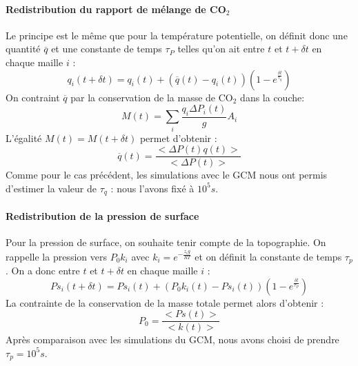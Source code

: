 \documentclass[11pt,a4paper]{article}
\begin{document}
\paragraph{Redistribution du rapport de mélange de CO$_2$ \\} 
Le principe est le même que pour la température potentielle, on définit donc une quantité $\overline{q}$ et une constante de temps $\tau_P$ telles qu'on ait entre $t$ et $t+\delta t$ en chaque maille $i$ :
\begin{equation}
q_i(t+\delta t) = q_i(t) + \left( \overline{q}(t) -  q_i(t) \right) \left( 1 - e^{\frac{\delta t}{\tau_q}} \right)
\end{equation}
On contraint $\overline{q}$ par la conservation de la masse de CO$_2$ dans la couche:
\begin{equation}
M(t) = \sum_i \frac{q_i \Delta P_i(t)}{g} A_i
\end{equation}
L'égalité $M(t) = M(t+\delta t)$ permet d'obtenir :
\begin{equation}
\overline{q}(t) =  \frac{< \Delta P(t)q(t) >}{< \Delta P(t) >}
\end{equation}
 Comme pour le cas précédent, les simulations avec le GCM nous ont permis d'estimer la valeur de $\tau_q$ : nous l'avons fixé à $10^5s$. \\
 
\paragraph{Redistribution de la pression de surface \\} 
Pour la pression de surface, on souhaite tenir compte de la topographie. On rappelle la pression vers $P_0 k_i$ avec $k_i = e^{-\frac{z_i g}{RT}}$ et on définit la constante de temps $\tau_p$. On a donc entre $t$ et $t + \delta t$ en chaque maille $i$ :
\begin{equation}
Ps_i(t+\delta t) = Ps_i(t) + \left( P_0 k_i(t) -  Ps_i(t) \right) \left( 1 - e^{\frac{\delta t}{\tau_P}} \right)
\end{equation}
La contrainte de la conservation de la masse totale permet alors d'obtenir :
\begin{equation}
P_0 = \frac{< Ps(t) >}{< k(t) >}
\end{equation}
Après comparaison avec les simulations du GCM, nous avons choisi de prendre $\tau_p = 10^5 s$. \\
\end{document}
